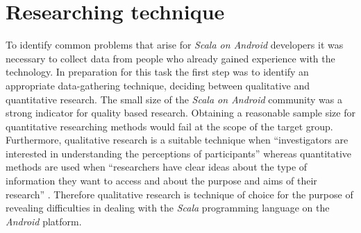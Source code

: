 \section{Researching technique}

To identify common problems that arise for \textit{Scala on Android} developers it was necessary to collect data from people who already gained experience with the technology. In preparation for this task the first step was to identify an appropriate data-gathering technique, deciding between qualitative and quantitative research. The small size of the \textit{Scala on Android} community was a strong indicator for quality based research. Obtaining a reasonable sample size for quantitative researching methods would fail at the scope of the target group. Furthermore, qualitative research is a suitable technique when \enquote{investigators are interested in understanding the perceptions of participants} \cite[p. 72]{berg01} whereas quantitative methods are used when \enquote{researchers have clear ideas about the type of information they want to access and about the purpose and aims of their research} \cite[p. 72]{berg01}. Therefore qualitative research is technique of choice for the purpose of revealing difficulties in dealing with the \textit{Scala} programming language on the \textit{Android} platform.